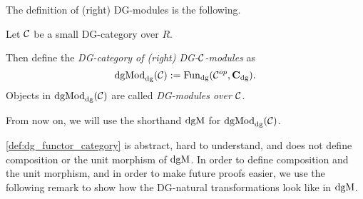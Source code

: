 The definition of (right) DG-modules is the following.

\begin{definition}
    Let \( {\mathcal{C}} \) be a small DG-category over \( R \).

    Then define the \emph{DG-category of (right) DG-\( {\mathcal{C}} \)-modules} as
    \[
        \operatorname{dgMod}_{\operatorname{dg}}({\mathcal{C}}) := \operatorname{Fun}_{\operatorname{dg}}({\mathcal{C}}^{op}, \operatorname{\mathbf{C}}_{\operatorname{dg}}).
    \]
    Objects in \( \operatorname{dgMod}_{\operatorname{dg}}({\mathcal{C}}) \) are called \emph{DG-modules over \( {\mathcal{C}} \)}.

    From now on, we will use the shorthand \( \operatorname{dgM} \) for \( \operatorname{dgMod}_{\operatorname{dg}}({\mathcal{C}}) \).
\end{definition}

\autoref{def:dg_functor_category} is abstract, hard to understand, and does not define composition or the unit morphism of \( \operatorname{dgM} \). In order to define composition and the unit morphism, and in order to make future proofs easier, we use the following remark to show how the DG-natural transformations look like in \( \operatorname{dgM} \).


